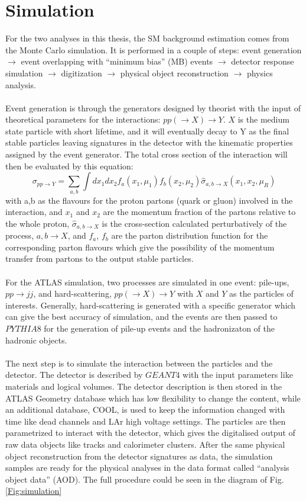 \section{Simulation}
\label{sec:simulation}
For the two analyses in this thesis, the SM background estimation comes from the Monte Carlo simulation. It is performed in a couple of steps: event generation $\rightarrow$ event overlapping with ``minimum bias'' (MB) events $\rightarrow$  detector response simulation $\rightarrow$ digitization $\rightarrow$ physical object reconstruction $\rightarrow$ physics analysis.
\\
\\Event generation is through the generators designed by theorist with the input of theoretical parameters for the interactions: $pp(\rightarrow X)\rightarrow Y$. $X$ is the medium state particle with short lifetime, and it will eventually decay to Y as the final stable particles leaving signatures in the detector with the kinematic properties assigned by the event generator. The total cross section of the interaction will then be evaluated by this equation: 
\begin{equation}
\sigma_{pp\rightarrow Y} = \sum_{a,b} \int dx_{1}dx_{2}f_{a}(x_{1},\mu_{1})f_{b}(x_{2},\mu_{2})\hat{\sigma}_{a,b\rightarrow X}(x_{1},x_{2},\mu_{R})
\end{equation}
with a,b as the flavours for the proton partons (quark or gluon) involved in the interaction, and $x_{1}$ and $x_{2}$ are the momentum fraction of the partons relative to the whole proton, $\hat{\sigma}_{a,b\rightarrow X}$ is the cross-section calculated perturbatively of the process, $a,b\rightarrow X$, and $f_{a}$, $f_{b}$ are the parton distribution function for the corresponding parton flavours which give the possibility of the momentum transfer from partons to the output stable particles. 
\\
\\For the ATLAS simulation, two processes are simulated in one event: pile-ups, $pp\rightarrow jj$, and hard-scattering, $pp(\rightarrow X)\rightarrow Y$ with $X$ and $Y$ as the particles of interests. Generally, hard-scattering is generated with a specific generator which can give the best accuracy of simulation, and the events are then passed to $PYTHIA8$ for the generation of pile-up events and the hadronizaton of the hadronic objects. 
\\
\\The next step is to simulate the interaction between the particles and the detector. The detector is described by $GEANT4$ with the input parameters like materials and logical volumes. The detector description is then stored in the ATLAS Geometry database which has low flexibility to change the content, while an additional database, COOL, is used to keep the information changed with time like dead channels and LAr high voltage settings. The particles are then parametrized to interact with the detector, which gives the digitalised output of raw data objects like tracks and calorimeter clusters. After the same physical object reconstruction from the detector signatures as data, the simulation samples are ready for the physical analyses in the data format called ``analysis object data'' (AOD). The full procedure could be seen in the diagram of Fig. \ref{Fig:simulation}
